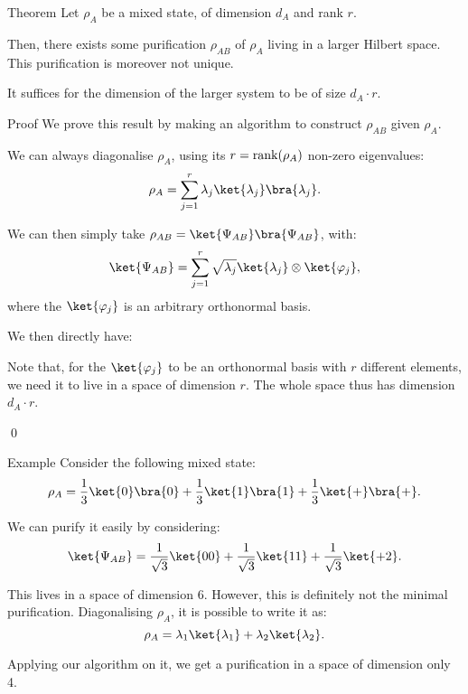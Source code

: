 \documentclass[a4paper]{article}
\begin{document}
\begin{parag}{Theorem}
    Let $\rho_A$ be a mixed state, of dimension $d_A$ and rank $r$.

    Then, there exists some purification $\rho_{AB}$ of $\rho_A$ living in a larger Hilbert space. This purification is moreover not unique.  

    It suffices for the dimension of the larger system to be of size $d_A\cdot r$.

    \begin{subparag}{Proof}
        We prove this result by making an algorithm to construct $\rho_{AB}$ given $\rho_A$.

        We can always diagonalise $\rho_A$, using its $r = \rank\left(\rho_A\right)$ non-zero eigenvalues: 
        \[\rho_A = \sum_{j=1}^{r} \lambda_j \ket{\lambda_j} \bra{\lambda_j}.\]

        We can then simply take $\rho_{AB} = \ket{\Psi_{AB}}\bra{\Psi_{AB}}$, with:
        \[\ket{\Psi_{AB}} = \sum_{j=1}^{r} \sqrt{\lambda_j} \ket{\lambda_j} \otimes \ket{\phi_j},\]
        where the $\ket{\phi_j}$ is an arbitrary orthonormal basis.

        We then directly have: 

        Note that, for the $\ket{\phi_j}$ to be an orthonormal basis with $r$ different elements, we need it to live in a space of dimension $r$. The whole space thus has dimension $d_A\cdot r$.

        \qed
    \end{subparag}
\end{parag}

\begin{parag}{Example}
    Consider the following mixed state: 
    \[\rho_A = \frac{1}{3}\ket{0}\bra{0} + \frac{1}{3} \ket{1}\bra{1} + \frac{1}{3} \ket{+}\bra{+}.\]

    We can purify it easily by considering: 
    \[\ket{\Psi_{AB}} = \frac{1}{\sqrt{3}} \ket{00} + \frac{1}{\sqrt{3}} \ket{11} + \frac{1}{\sqrt{3}} \ket{+2}.\]

    This lives in a space of dimension $6$. However, this is definitely not the minimal purification. Diagonalising $\rho_A$, it is possible to write it as: 
    \[\rho_A = \lambda_1 \ket{\lambda_1} + \lambda_2 \ket{\lambda_2}.\]

    Applying our algorithm on it, we get a purification in a space of dimension only 4.
\end{parag}
\end{document}
